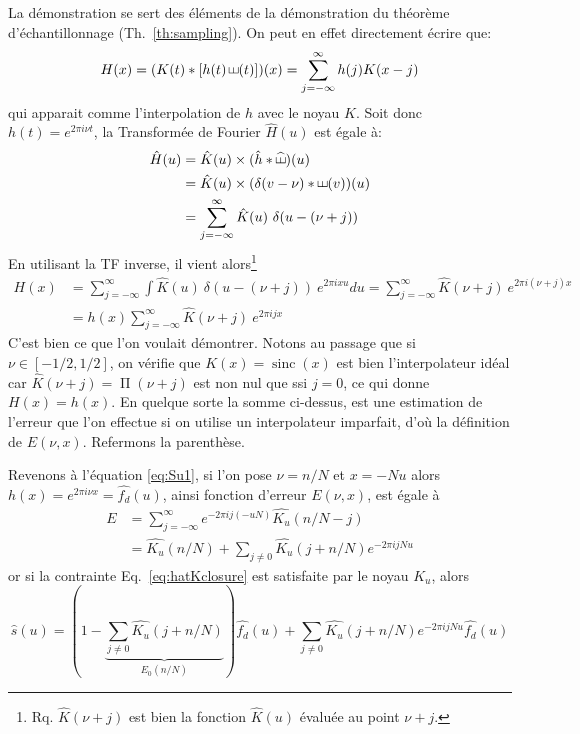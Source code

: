 \documentclass[11pt,twoside]{article}
\DeclareMathOperator{\sinc}{sinc}
\DeclareMathOperator{\comb}{\raisebox{\depth}{\rotatebox{270}{$\exists$}}}
\DeclareMathOperator{\boxcar}{{\mbox{$\Pi$}}}
\newcommand{\nn}{\nonumber}
\begin{document}
La démonstration se sert des éléments de la démonstration du théorème d'échantillonnage (Th.~\ref{th:sampling}).  On peut en effet directement écrire que:
\begin{equation}
H(x) = (K(t)\ast [h(t)\comb(t)])(x) = \sum_{j=-\infty}^\infty h(j) K(x-j)
\end{equation}
qui apparait comme l'interpolation de $h$ avec le noyau $K$. Soit donc $h(t)=e^{2\pi i \nu t}$, la Transformée de Fourier $\hat{H}(u)$ est égale à: 
\begin{align}
\hat{H}(u) &= \hat{K}(u)\times  (\hat{h}\ast \widehat{\comb})(u) \nn \\
&= \hat{K}(u)\times  (\delta(v-\nu)\ast \comb(v))(u) \nn \\
&=   \sum_{j=-\infty}^\infty \hat{K}(u)\ \delta(u-(\nu+j))
\end{align}
En utilisant la TF inverse, il vient alors\footnote{Rq. $\hat{K}(\nu+j)$ est bien la fonction $\hat{K}(u)$ évaluée au point $\nu+j$.}
\begin{align}
H(x) &=  \sum_{j=-\infty}^\infty \int  \hat{K}(u)\ \delta(u-(\nu+j))\ e^{2\pi i xu}du = \sum_{j=-\infty}^\infty \hat{K}(\nu+j)\ e^{2\pi i (\nu+j)x} \nn \\
&= h(x) \sum_{j=-\infty}^\infty \hat{K}(\nu+j)\  e^{2\pi i jx}
\end{align}
C'est bien ce que l'on voulait démontrer. Notons au passage que si $\nu\in [-1/2,1/2]$, on vérifie que $K(x)=\sinc(x)$ est bien l'interpolateur idéal car $\hat{K}(\nu+j)=\boxcar(\nu+j)$ est non nul que ssi $j=0$, ce qui donne $H(x)=h(x)$. En quelque sorte la somme ci-dessus, est une estimation de l'erreur que l'on effectue si on utilise un interpolateur imparfait, d'où la définition de $E(\nu,x)$. Refermons la parenthèse.

Revenons à l'équation \ref{eq:Su1}, si l'on pose $\nu=n/N$ et $x=-Nu$ alors $h(x)=e^{2\pi i \nu x}=\hat{f_d}(u)$, ainsi fonction d'erreur  $E(\nu,x)$, est égale à 
\begin{align}
E &= \sum_{j=-\infty}^\infty e^{-2\pi i j (-uN)} \widehat{K_u}(n/N-j) \nn\\
&=\widehat{K_u}(n/N)  + \sum_{j\neq 0} \widehat{K_u}(j+n/N) e^{-2\pi i j N u}
\end{align}
or si la contrainte Eq.~\ref{eq:hatKclosure} est satisfaite par le noyau $K_u$, alors
\begin{equation}
\hat{s}(u)= (1-\underbrace{\sum_{j\neq 0} \widehat{K_u}(j+n/N)}_{E_0(n/N)})\hat{f_d}(u) + \sum_{j\neq 0} \widehat{K_u}(j+n/N) e^{-2\pi i j N u} \hat{f_d}(u)
\end{equation}  
\end{document}
